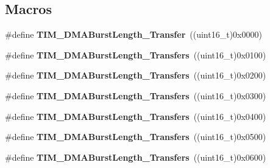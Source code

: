 \subsection*{Macros}
\begin{DoxyCompactItemize}
\item 
\mbox{\label{group___t_i_m___d_m_a___burst___length_gab87f91f1c5583b9888cb6bb37fc639e2}} 
\#define {\bfseries T\+I\+M\+\_\+\+D\+M\+A\+Burst\+Length\+\_\+Transfer}~((uint16\+\_\+t)0x0000)
\item 
\mbox{\label{group___t_i_m___d_m_a___burst___length_ga829504c3e8c90a9445f6a223bc3034f8}} 
\#define {\bfseries T\+I\+M\+\_\+\+D\+M\+A\+Burst\+Length\+\_\+Transfers}~((uint16\+\_\+t)0x0100)
\item 
\mbox{\label{group___t_i_m___d_m_a___burst___length_ga3a99863a0925e0cc9a11b91aade66f11}} 
\#define {\bfseries T\+I\+M\+\_\+\+D\+M\+A\+Burst\+Length\+\_\+Transfers}~((uint16\+\_\+t)0x0200)
\item 
\mbox{\label{group___t_i_m___d_m_a___burst___length_ga84bfeb309593a1ac580e233bf7514b36}} 
\#define {\bfseries T\+I\+M\+\_\+\+D\+M\+A\+Burst\+Length\+\_\+Transfers}~((uint16\+\_\+t)0x0300)
\item 
\mbox{\label{group___t_i_m___d_m_a___burst___length_ga44f8aa51fbe8887a5f3c37a0e776902c}} 
\#define {\bfseries T\+I\+M\+\_\+\+D\+M\+A\+Burst\+Length\+\_\+Transfers}~((uint16\+\_\+t)0x0400)
\item 
\mbox{\label{group___t_i_m___d_m_a___burst___length_ga8be40a21654eea72e9c1bf9922675b22}} 
\#define {\bfseries T\+I\+M\+\_\+\+D\+M\+A\+Burst\+Length\+\_\+Transfers}~((uint16\+\_\+t)0x0500)
\item 
\mbox{\label{group___t_i_m___d_m_a___burst___length_gaf2ae83bd73b0e92b73e5ebfc11f9bfad}} 
\#define {\bfseries T\+I\+M\+\_\+\+D\+M\+A\+Burst\+Length\+\_\+Transfers}~((uint16\+\_\+t)0x0600)
\item 
\mbox{\label{group___t_i_m___d_m_a___burst___length_ga8a760d7114425596736b0ecdbe5fdea6}} 

\end{DoxyCompactItemize}
